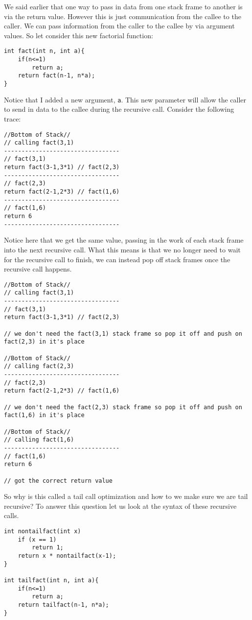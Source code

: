 \documentclass[main.tex]{subfiles}
\begin{document}
We said earlier that one way to pass in data from one stack frame to another is via the return value. However this is just communication from the callee to the caller. We can pass information from the caller to the callee by via argument values. 
So let consider this new factorial function:
\begin{lstlisting}[style=Mycstyle]
int fact(int n, int a){
    if(n<=1)
        return a;
    return fact(n-1, n*a);
}
\end{lstlisting}
Notice that I added a new argument, \texttt{a}. This new parameter will allow the caller to send in data to the callee during the recursive call. Consider the following trace:
\begin{lstlisting}[style=Mycstyle]
//Bottom of Stack//
// calling fact(3,1)
---------------------------------
// fact(3,1)
return fact(3-1,3*1) // fact(2,3)
---------------------------------
// fact(2,3)
return fact(2-1,2*3) // fact(1,6) 
---------------------------------
// fact(1,6)
return 6
---------------------------------
\end{lstlisting}
Notice here that we get the same value, passing in the work of each stack frame into the next recursive call. What this means is that we no longer need to wait for the recursive call to finish, we can instead pop off stack frames once the recursive call happens. 
\begin{lstlisting}[style=Mycstyle]
//Bottom of Stack//
// calling fact(3,1)
---------------------------------
// fact(3,1)
return fact(3-1,3*1) // fact(2,3)

// we don't need the fact(3,1) stack frame so pop it off and push on fact(2,3) in it's place

//Bottom of Stack//
// calling fact(2,3)
---------------------------------
// fact(2,3)
return fact(2-1,2*3) // fact(1,6)

// we don't need the fact(2,3) stack frame so pop it off and push on fact(1,6) in it's place

//Bottom of Stack//
// calling fact(1,6)
---------------------------------
// fact(1,6)
return 6

// got the correct return value
\end{lstlisting}

So why is this called a tail call optimization and how to we make sure we are tail recursive? 
To answer this question let us look at the syntax of these recursive calls. 
\begin{lstlisting}[style=Myocamlstyle]
int nontailfact(int x)
    if (x == 1)
        return 1;
    return x * nontailfact(x-1);
}

int tailfact(int n, int a){
    if(n<=1)
        return a;
    return tailfact(n-1, n*a);
}
\end{lstlisting}
\end{document}
